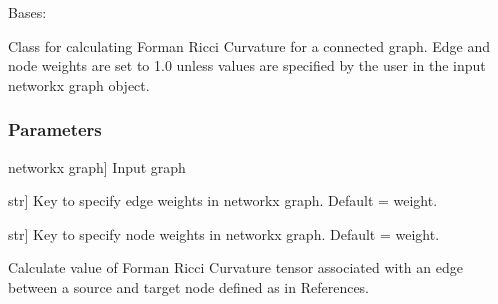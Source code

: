 \documentclass[letterpaper,10pt,english]{sphinxmanual}
\begin{document}
\begin{fulllineitems}
\label{\detokenize{graph_ricci_curvature:graph_ricci_curvature.forman_ricci_curvature.FormanRicciCurvature}}
\pysigstartsignatures
{}
\pysigstopsignatures
\sphinxAtStartPar
Bases: 

\sphinxAtStartPar
Class for calculating Forman Ricci Curvature for a connected graph. Edge and
node weights are set to 1.0 unless values are specified by the user in the input
networkx graph object.


\subsubsection{Parameters}
\label{\detokenize{graph_ricci_curvature:parameters}}\begin{description}
\sphinxlineitem{G}{[}networkx graph{]}
\sphinxAtStartPar
Input graph

\sphinxlineitem{edge\_weight\_key}{[}str{]}
\sphinxAtStartPar
Key to specify edge weights in networkx graph. Default = weight.

\sphinxlineitem{node\_weight\_key}{[}str{]}
\sphinxAtStartPar
Key to specify node weights in networkx graph. Default = weight.

\end{description}

\begin{fulllineitems}
\label{\detokenize{graph_ricci_curvature:graph_ricci_curvature.forman_ricci_curvature.FormanRicciCurvature.calculate_edge_curvature}}
\pysigstartsignatures
{}
\pysigstopsignatures
\sphinxAtStartPar
Calculate value of Forman Ricci Curvature tensor associated with an edge
between a source and target node defined as in References.



\end{fulllineitems}
\end{fulllineitems}
\end{document}
